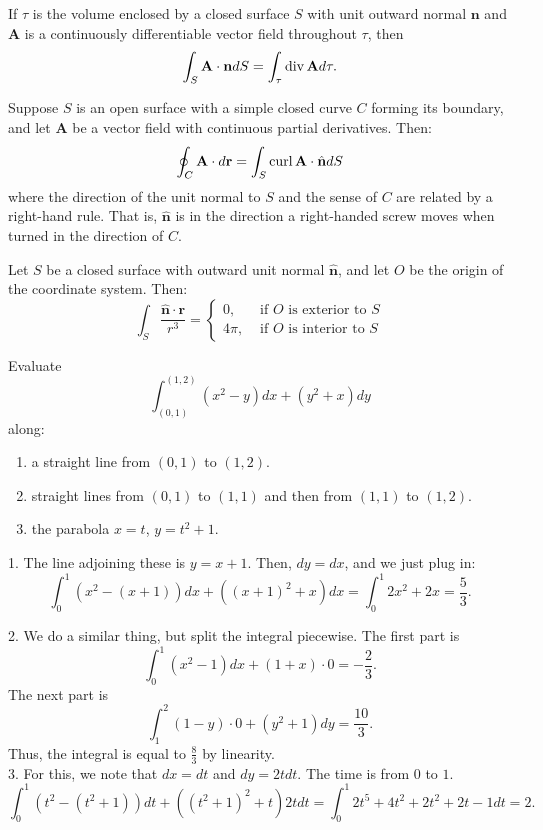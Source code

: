 \begin{theorem}
If $\tau$ is the volume enclosed by a closed surface $S$ with unit outward normal
$\mathbf{n}$ and $\mathbf{A}$ is a continuously differentiable vector field throughout $\tau$,
then 
\[
\int_S \mathbf{A} \cdot \mathbf{n} dS = \int_{\tau} \operatorname{div} \mathbf{A} d\tau.
\]
\end{theorem}

\begin{theorem}
Suppose $S$ is an open surface with a simple closed curve $C$ forming its boundary, and let $\textbf{A}$ be a vector 
field with continuous partial derivatives. Then:
\[
\oint_{C} \mathbf{A} \cdot d \mathbf{r} 
= \int_S \operatorname{curl} \mathbf{A} \cdot \hat{\mathbf{n}} dS
\]
where the direction of the unit normal to $S$ and the sense of $C$ are related by a right-hand rule. 
That is, $\hat{\mathbf{n}}$ is in the direction a right-handed screw moves when turned in the direction of $C$.
\end{theorem}

\begin{theorem}
Let $S$ be a closed surface with outward unit normal $\hat{\textbf{n}}$, and let $O$ be the origin of the coordinate system. Then:
\[
\int_S \frac{\hat{\textbf{n}} \cdot \textbf{r}}{r^3} = \begin{cases}
0, & \text{ if } O \text{ is exterior to } S \\
4\pi, & \text{ if } O \text{ is interior to } S
\end{cases}
\]
\end{theorem}

\begin{exercise}
Evaluate
\[
\int_{(0,1)}^{(1,2)} (x^2-y) dx+(y^2+x) dy
\]
along:
\begin{enumerate}
\item a straight line from $(0,1)$ to $(1,2)$.
\item straight lines from $(0,1)$ to $(1,1)$ and then from $(1,1)$ to $(1,2)$.
\item the parabola $x=t$, $y=t^2+1$.
\end{enumerate}
\end{exercise}
\begin{solution}
1. The line adjoining these is $y = x + 1$. Then, $dy = dx$, and we just plug in:
\[
\int_0^1 (x^2 - (x + 1))dx + ((x+1)^2 + x)dx 
= \int_0^1 2x^2 + 2x 
= \frac{5}{3}.
\]

2. We do a similar thing, but split the integral piecewise. The first part is
\[
\int_0^1 (x^2 - 1)dx + (1 + x)\cdot 0
= -\frac{2}{3}.
\]
The next part is
\[
\int_1^2 (1 - y) \cdot 0 + (y^2 + 1)dy 
= \frac{10}{3}.
\]
Thus, the integral is equal to $\frac{8}{3}$ by linearity. \\

3. For this, we note that $dx = dt$ and $dy = 2t dt$. The time is from $0$ to $1$.
\[
\int_0^1 (t^2 - (t^2 + 1))dt + ((t^2+ 1)^2 + t) 2tdt
= \int_0^1 2t^5 + 4t^2 + 2t^2 + 2t - 1 dt
= 2.
\]
\end{solution}

